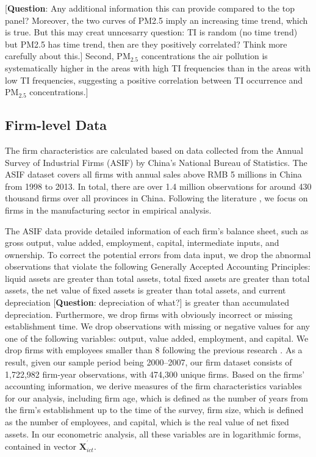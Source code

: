 \documentclass[12pt]{article}
\begin{document}
[\textbf{Question}: Any additional information this can provide compared to
the top panel? Moreover, the two curves of PM2.5 imply an increasing time
trend, which is true. But this may creat unncesarry question: TI is random
(no time trend) but PM2.5 has time trend, then are they positively
correlated? Think more carefully about this.] Second, $\mathrm{PM_{2.5}}$
concentrations the air pollution is systematically higher in the areas with
high TI frequencies than in the areas with low TI frequencies, suggesting a
positive correlation between TI occurrence and $\mathrm{PM_{2.5}}$
concentrations.]

\subsection{Firm-level Data}

\label{sec:data_firm} The firm characteristics are calculated based on data
collected from the Annual Survey of Industrial Firms (ASIF) by China's
National Bureau of Statistics. The ASIF dataset covers all firms with annual
sales above RMB 5 millions in China from 1998 to 2013. In total, there are
over 1.4 million observations for around 430 thousand firms over all
provinces in China. Following the literature \citep[e.g.,][]{fu2021trans},
we focus on firms in the manufacturing sector in empirical analysis.

The ASIF data provide detailed information of each firm's balance sheet,
such as gross output, value added, employment, capital, intermediate inputs,
and ownership. To correct the potential errors from data input, we drop the
abnormal observations that violate the following Generally Accepted
Accounting Principles: liquid assets are greater than total assets, total
fixed assets are greater than total assets, the net value of fixed assets is
greater than total assets, and current depreciation [\textbf{Question}:
depreciation of what?] is greater than accumulated depreciation.
Furthermore, we drop firms with obviously incorrect or missing establishment
time. We drop observations with missing or negative values for any one of
the following variables: output, value added, employment, and capital. We
drop firms with employees smaller than 8 following the previous research %
\citep{brandt2012creative}. As a result, given our sample period being
2000--2007, our firm dataset consists of 1,722,982 firm-year observations,
with 474,300 unique firms. Based on the firms' accounting information, we
derive measures of the firm characteristics variables for our analysis,
including firm age, which is defined as the number of years from the firm's
establishment up to the time of the survey, firm size, which is defined as
the number of employees, and capital, which is the real value of net fixed
assets. In our econometric analysis, all these variables are in logarithmic
forms, contained in vector $\mathbf{X}_{ict}^{^{\prime }}.$
\end{document}
